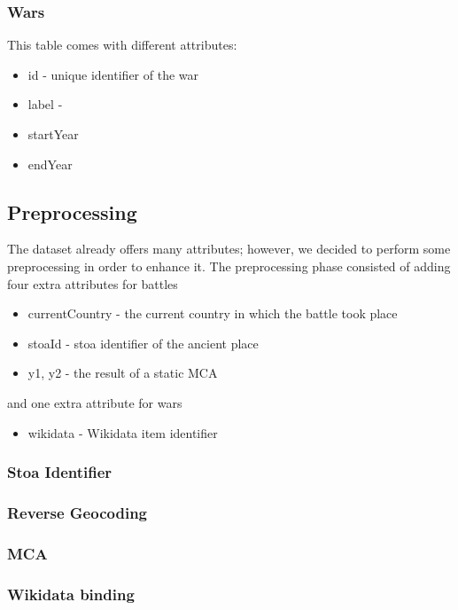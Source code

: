 \subsubsection{Wars}
This table comes with different attributes:
\begin{itemize}
    \item id - unique identifier of the war
    \item label - 
    \item startYear
    \item endYear
\end{itemize}

\subsection{Preprocessing}
The dataset already offers many attributes; however, we decided to perform some preprocessing in order to enhance it. The preprocessing phase consisted of adding four extra attributes for battles
\begin{itemize}
    \item currentCountry - the current country in which the battle took place
    \item stoaId - stoa identifier of the ancient place
    \item y1, y2 - the result of a static MCA
\end{itemize}

and one extra attribute for wars
\begin{itemize}
    \item wikidata - Wikidata item identifier
\end{itemize}

\subsubsection{Stoa Identifier}
\subsubsection{Reverse Geocoding}
\subsubsection{MCA}
\subsubsection{Wikidata binding}
